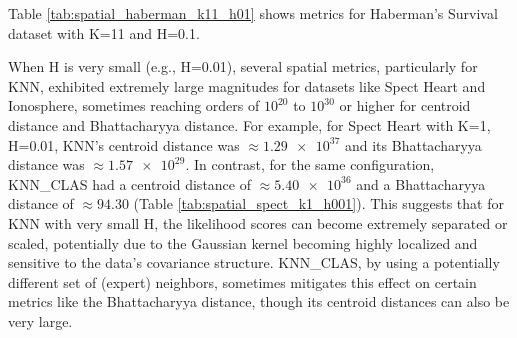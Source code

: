 \documentclass[conference]{IEEEtran}
\begin{document}
Table \ref{tab:spatial_haberman_k11_h01} shows metrics for Haberman's Survival dataset with K=11 and H=0.1.
\begin{table}[H]
\centering
\caption{Spatial Likelihood Metrics for Haberman's Survival (K=11, H=0.1)}
\label{tab:spatial_haberman_k11_h01}
\end{table}

When H is very small (e.g., H=0.01), several spatial metrics, particularly for KNN, exhibited extremely large magnitudes for datasets like Spect Heart and Ionosphere, sometimes reaching orders of $10^{20}$ to $10^{30}$ or higher for centroid distance and Bhattacharyya distance. For example, for Spect Heart with K=1, H=0.01, KNN's centroid distance was $\approx \num{1.29e+37}$ and its Bhattacharyya distance was $\approx \num{1.57e+29}$. In contrast, for the same configuration, KNN\_CLAS had a centroid distance of $\approx \num{5.40e+36}$ and a Bhattacharyya distance of $\approx \num{94.30}$ (Table \ref{tab:spatial_spect_k1_h001}). This suggests that for KNN with very small H, the likelihood scores can become extremely separated or scaled, potentially due to the Gaussian kernel becoming highly localized and sensitive to the data's covariance structure. KNN\_CLAS, by using a potentially different set of (expert) neighbors, sometimes mitigates this effect on certain metrics like the Bhattacharyya distance, though its centroid distances can also be very large.
\end{document}
